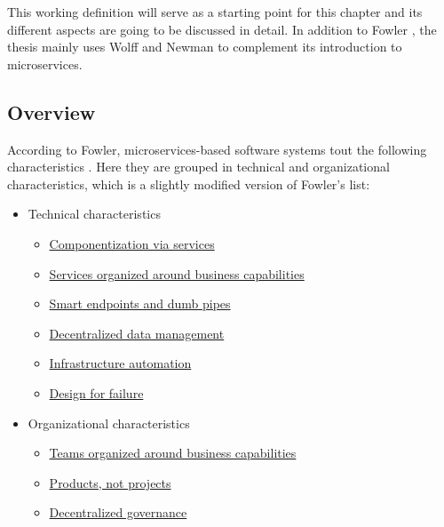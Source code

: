 This working definition will serve as a starting point for this chapter and its different aspects are going to be discussed in detail.
In addition to Fowler \cite{Fowler2014}, the thesis mainly uses Wolff and Newman \cite{Wolff2016, Newman2015} to complement its introduction to microservices.

\subsection{Overview}
%
%
\label{background:characteristics}
According to Fowler, microservices-based software systems tout the following characteristics  \cite{Fowler2014}. 
Here they are grouped in technical and organizational characteristics, which is a slightly modified version of Fowler's list:
\begin{itemize}
	\item Technical characteristics
	\begin{itemize}
		\item \hyperref[bac:ComponentizationViaServices]{Componentization via services}
		\item \hyperref[bac:businessCapability]{Services organized around business capabilities}
		\item \hyperref[bac:endpoints]{Smart endpoints and dumb pipes}
		\item \hyperref[bac:decentralizedDataManagement]{Decentralized data management}
		\item \hyperref[bac:infraAutomation]{Infrastructure automation}
		\item \hyperref[bac:DesignForFailure]{Design for failure}
	\end{itemize}
	\item Organizational characteristics
	\begin{itemize}
		\item \hyperref[bac:teamsBusinessCapabilities]{Teams organized around business capabilities}
		\item \hyperref[bac:productsNotProjects]{Products, not projects}
		\item \hyperref[bac:decentralizedGovernance]{Decentralized governance}
	\end{itemize}
\end{itemize}

